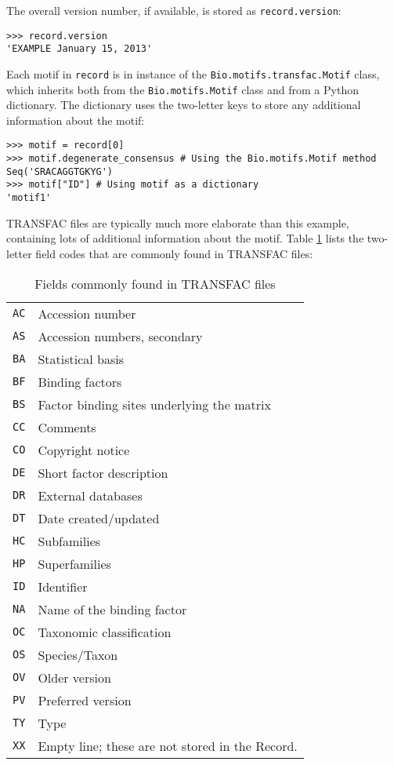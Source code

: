 The overall version number, if available, is stored as \verb+record.version+:
\begin{verbatim}
>>> record.version
'EXAMPLE January 15, 2013'
\end{verbatim}

Each motif in \verb+record+ is in instance of the \verb+Bio.motifs.transfac.Motif+
class, which inherits both from the \verb+Bio.motifs.Motif+ class and
from a Python dictionary. The dictionary uses the two-letter keys to
store any additional information about the motif:
\begin{verbatim}
>>> motif = record[0]
>>> motif.degenerate_consensus # Using the Bio.motifs.Motif method
Seq('SRACAGGTGKYG')
>>> motif["ID"] # Using motif as a dictionary
'motif1'
\end{verbatim}

TRANSFAC files are typically much more elaborate than this example, containing
lots of additional information about the motif. Table \ref{table:transfaccodes}
lists the two-letter field codes that are commonly found in TRANSFAC files:
\begin{table}[h]
\label{table:transfaccodes}
\begin{center}
\caption{Fields commonly found in TRANSFAC files}
\begin{tabular}{|l|l||}
\verb+AC+ & Accession number \\
\verb+AS+ & Accession numbers, secondary \\
\verb+BA+ & Statistical basis \\
\verb+BF+ & Binding factors \\
\verb+BS+ & Factor binding sites underlying the matrix \\
\verb+CC+ & Comments \\
\verb+CO+ & Copyright notice \\
\verb+DE+ & Short factor description \\
\verb+DR+ & External databases \\
\verb+DT+ & Date created/updated \\
\verb+HC+ & Subfamilies \\
\verb+HP+ & Superfamilies \\
\verb+ID+ & Identifier \\
\verb+NA+ & Name of the binding factor \\
\verb+OC+ & Taxonomic classification \\
\verb+OS+ & Species/Taxon \\
\verb+OV+ & Older version \\
\verb+PV+ & Preferred version \\
\verb+TY+ & Type \\
\verb+XX+ & Empty line; these are not stored in the Record. \\
\end{tabular}
\end{center}
\end{table}

